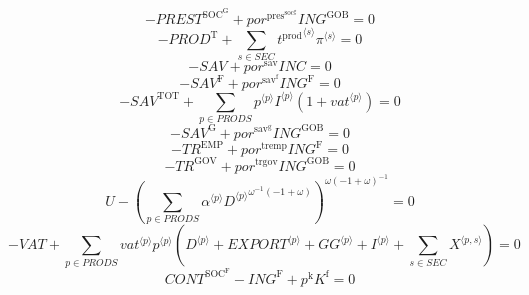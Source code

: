 \begin{equation}
-{P\!R\!E\!S\!T}^{\mathrm{SOC}^{\mathrm{G}}} + {{p\!o\!r}^{\mathrm{pres}^{\mathrm{soc}^{\mathrm{g}}}}} {{I\!N\!G}^{\mathrm{GOB}}} = 0
\end{equation}
\begin{equation}
-{P\!R\!O\!D}^{\mathrm{T}} + \sum_{s\in {S\!E\!C}} {{t^{\mathrm{prod}}}^{\langle s\rangle}} {{\pi}^{\langle s\rangle}} = 0
\end{equation}
\begin{equation}
-{S\!A\!V} + {{p\!o\!r}^{\mathrm{sav}}} {{I\!N\!C}} = 0
\end{equation}
\begin{equation}
-{S\!A\!V}^{\mathrm{F}} + {{p\!o\!r}^{\mathrm{sav}^{\mathrm{f}}}} {{I\!N\!G}^{\mathrm{F}}} = 0
\end{equation}
\begin{equation}
-{S\!A\!V}^{\mathrm{TOT}} + \sum_{p\in {P\!R\!O\!D\!S}} {{p}^{\langle p\rangle}} {{I}^{\langle p\rangle}} \left(1 + {{v\!a\!t}}^{\langle p\rangle}\right) = 0
\end{equation}
\begin{equation}
-{S\!A\!V}^{\mathrm{G}} + {{p\!o\!r}^{\mathrm{sav}^{\mathrm{g}}}} {{I\!N\!G}^{\mathrm{GOB}}} = 0
\end{equation}
\begin{equation}
-{T\!R}^{\mathrm{EMP}} + {{p\!o\!r}^{\mathrm{tremp}}} {{I\!N\!G}^{\mathrm{F}}} = 0
\end{equation}
\begin{equation}
-{T\!R}^{\mathrm{GOV}} + {{p\!o\!r}^{\mathrm{trgov}}} {{I\!N\!G}^{\mathrm{GOB}}} = 0
\end{equation}
\begin{equation}
U - \left(\sum_{p\in {P\!R\!O\!D\!S}} {{\alpha}^{\langle p\rangle}} {{{D}^{\langle p\rangle}}^{{\omega}^{-1} \left(-1 + \omega\right)}}\right)^{{\omega} \left(-1 + \omega\right)^{-1}} = 0
\end{equation}
\begin{equation}
-{V\!A\!T} + \sum_{p\in {P\!R\!O\!D\!S}} {{{v\!a\!t}}^{\langle p\rangle}} {{p}^{\langle p\rangle}} \left({D}^{\langle p\rangle} + {{E\!X\!P\!O\!R\!T}}^{\langle p\rangle} + {{G\!G}}^{\langle p\rangle} + {I}^{\langle p\rangle} + \sum_{s\in {S\!E\!C}} {X}^{\langle p,s\rangle}\right) = 0
\end{equation}
\begin{equation}
{C\!O\!N\!T}^{\mathrm{SOC}^{\mathrm{F}}} - {I\!N\!G}^{\mathrm{F}} + {p^{\mathrm{k}}} {K^{\mathrm{f}}} = 0
\end{equation}
